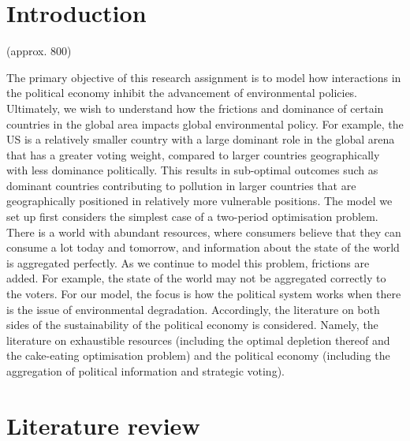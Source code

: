 \documentclass[11pt,preprint, authoryear]{elsarticle}
\numberwithin{equation}{section}
\numberwithin{figure}{section}
\numberwithin{table}{section}
\begin{document}
\pagestyle{fancy}
\chead{}
\rhead{}
\lfoot{}
\lhead{}
\cfoot{}


\headsep 35pt %




\hypertarget{introduction}{%
\section{\texorpdfstring{Introduction
\label{Introduction}}{Introduction }}\label{introduction}}

(approx. 800)

The primary objective of this research assignment is to model how
interactions in the political economy inhibit the advancement of
environmental policies. Ultimately, we wish to understand how the
frictions and dominance of certain countries in the global area impacts
global environmental policy. For example, the US is a relatively smaller
country with a large dominant role in the global arena that has a
greater voting weight, compared to larger countries geographically with
less dominance politically. This results in sub-optimal outcomes such as
dominant countries contributing to pollution in larger countries that
are geographically positioned in relatively more vulnerable positions.
The model we set up first considers the simplest case of a two-period
optimisation problem. There is a world with abundant resources, where
consumers believe that they can consume a lot today and tomorrow, and
information about the state of the world is aggregated perfectly. As we
continue to model this problem, frictions are added. For example, the
state of the world may not be aggregated correctly to the voters. For
our model, the focus is how the political system works when there is the
issue of environmental degradation. Accordingly, the literature on both
sides of the sustainability of the political economy is considered.
Namely, the literature on exhaustible resources (including the optimal
depletion thereof and the cake-eating optimisation problem) and the
political economy (including the aggregation of political information
and strategic voting).

\hypertarget{literature-review}{%
\section{Literature review}\label{literature-review}}
\end{document}

